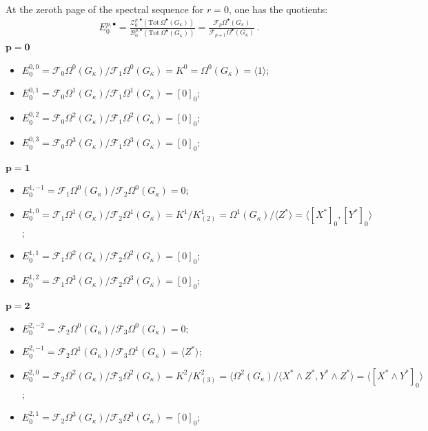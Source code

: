 \documentclass[10pt]{amsart}
\theoremstyle{remark}
\numberwithin{equation}{section}
\begin{document}
At the zeroth page of the spectral sequence for $r=0$, one has the quotients:
\begin{align*}
    E_0^{p,\bullet}=\frac{\mathcal{Z}_0^{p,\bullet}(\mathrm{Tot}\,\Omega^\bullet(G_\kappa))}{\mathcal{B}_0^{p,\bullet}(\mathrm{Tot}\,\Omega^\bullet(G_\kappa))}=\frac{\mathcal{F}_p\Omega^\bullet(G_\kappa)}{\mathcal{F}_{p+1}\Omega^\bullet(G_\kappa)}\,.
\end{align*}
$\mathbf{p=0}$
\begin{itemize}
    \item $E^{0,0}_0=\mathcal{F}_0\Omega^0(G_\kappa)/\mathcal{F}_1\Omega^0(G_\kappa)=K^0=\Omega^0(G_\kappa)=\langle 1\rangle$;
    \item $E_0^{0,1}=\mathcal{F}_0\Omega^1(G_\kappa)/\mathcal{F}_1\Omega^1(G_\kappa)=[0]_0$;
    \item $E_0^{0,2}=\mathcal{F}_0\Omega^2(G_\kappa)/\mathcal{F}_1\Omega^2(G_\kappa)=[0]_0$;
    \item $E_0^{0,3}=\mathcal{F}_0\Omega^3(G_\kappa)/\mathcal{F}_1\Omega^3(G_\kappa)=[0]_0$;
\end{itemize}
$\mathbf{p=1}$
\begin{itemize}
    \item $E_0^{1,-1}=\mathcal{F}_1\Omega^0(G_\kappa)/\mathcal{F}_2\Omega^0(G_\kappa)=0$;
    \item $E_0^{1,0}=\mathcal{F}_1\Omega^1(G_\kappa)/\mathcal{F}_2\Omega^1(G_\kappa)=K^1/K^1_{(2)}=\Omega^1(G_\kappa)/\langle Z^\ast\rangle=\langle [X^\ast]_0,[Y^\ast]_0\rangle$;
    \item $E_0^{1,1}=\mathcal{F}_1\Omega^2(G_\kappa)/\mathcal{F}_2\Omega^2(G_\kappa)= [0]_0$;
    \item $E_0^{1,2}=\mathcal{F}_1\Omega^3(G_\kappa)/\mathcal{F}_2\Omega^3(G_\kappa)=[0]_0$;
\end{itemize}
$\mathbf{p=2}$
\begin{itemize}
    \item $E^{2,-2}_0=\mathcal{F}_2\Omega^0(G_\kappa)/\mathcal{F}_3\Omega^0(G_\kappa)=0$;
    \item $E_0^{2,-1}=\mathcal{F}_2\Omega^1(G_\kappa)/\mathcal{F}_3\Omega^1(G_\kappa)=\langle Z^\ast\rangle$;
    \item $E_0^{2,0}=\mathcal{F}_2\Omega^2(G_\kappa)/\mathcal{F}_3\Omega^2(G_\kappa)=K^2/K^2_{(3)}=\langle \Omega^2(G_\kappa)/\langle X^\ast\wedge Z^\ast, Y^\ast\wedge Z^\ast\rangle=\langle [X^\ast\wedge Y^\ast]_0\rangle$;
    \item $E_0^{2,1}=\mathcal{F}_2\Omega^3(G_\kappa)/\mathcal{F}_3\Omega^3(G_\kappa)=[0]_0$;
\end{itemize}
\end{document}
